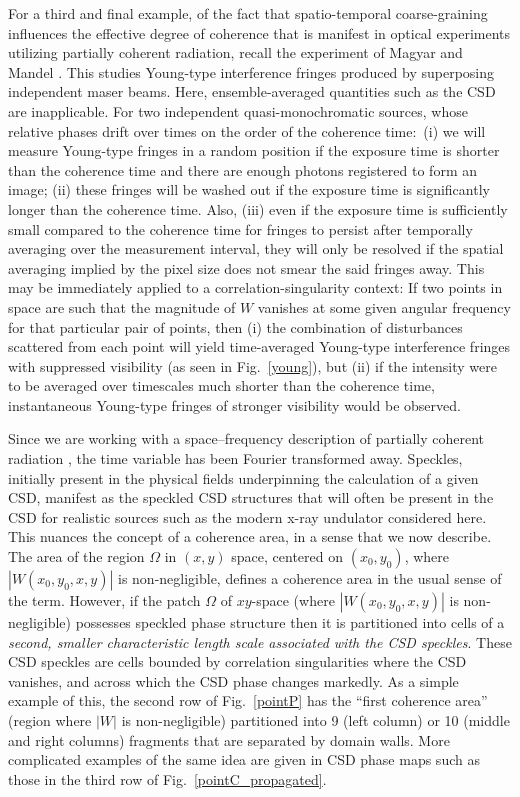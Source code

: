 \documentclass[%
 reprint,
 amsmath,amssymb,
 aps,
]{revtex4-1}
\begin{document}
For a third and final example, of the fact that spatio-temporal coarse-graining influences the effective degree of coherence that is manifest in optical experiments utilizing partially coherent radiation, recall the experiment of Magyar and Mandel \cite{MagyarMandel1963}.  This studies Young-type interference fringes produced by superposing independent maser beams.  Here, ensemble-averaged quantities such as the CSD are inapplicable.  For two independent quasi-monochromatic sources, whose relative phases drift over times on the order of the coherence time:~(i) we will measure Young-type fringes in a random position if the exposure time is shorter than the coherence time and there are enough photons registered to form an image; (ii) these fringes will be washed out if the exposure time is significantly longer than the coherence time.  Also, (iii) even if the exposure time is sufficiently small compared to the coherence time for fringes to persist after temporally averaging over the measurement interval, they will only be resolved if the spatial averaging implied by the pixel size does not smear the said fringes away.  This may be immediately applied to a correlation-singularity context: If two points in space are such that the magnitude of $W$ vanishes at some given angular frequency for that particular pair of points, then (i) the combination of disturbances scattered from each point will yield time-averaged Young-type interference fringes with suppressed visibility (as seen in Fig.~\ref{young}), but (ii) if the intensity were to be averaged over timescales much shorter than the coherence time, instantaneous Young-type fringes of stronger visibility would be observed.   

Since we are working with a space--frequency description of partially coherent radiation \cite{Wolf1982,mandel_wolf,wolf_thin_book}, the time variable has been Fourier transformed away.  Speckles, initially present in the physical fields underpinning the calculation of a given CSD, manifest as the speckled CSD structures that will often be present in the CSD for realistic sources such as the modern x-ray undulator considered here.  This nuances the concept of a coherence area, in a sense that we now describe.  The area of the region $\Omega$ in $(x,y)$ space, centered on $(x_0,y_0)$, where $|W(x_0,y_0,x,y)|$ is non-negligible, defines a coherence area in the usual sense of the term.  However, if the patch $\Omega$ of $xy$-space (where $|W(x_0,y_0,x,y)|$ is non-negligible) possesses speckled phase structure then it is partitioned into cells of a {\em second, smaller characteristic length scale associated with the CSD speckles}.  These CSD speckles are cells bounded by correlation singularities where the CSD vanishes, and across which the CSD phase changes markedly.  As a simple example of this, the second row of Fig.~\ref{pointP} has the ``first coherence area'' (region where $|W|$ is non-negligible) partitioned into 9 (left column) or 10 (middle and right columns) fragments that are separated by domain walls.  More complicated examples of the same idea are given in CSD phase maps such as those in the third row of Fig.~\ref{pointC_propagated}.
\end{document}
